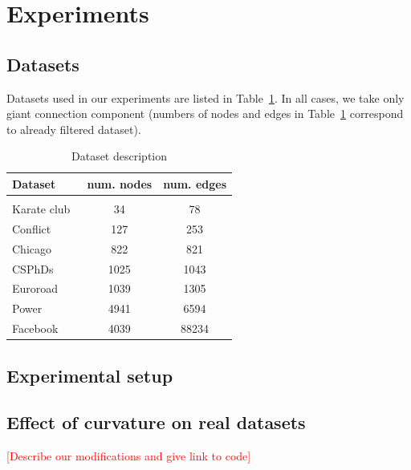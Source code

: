 \documentclass{article} %
\begin{document}
\section{Experiments}

\subsection{Datasets}\label{sec:datasets}

Datasets used in our experiments are listed in Table~\ref{tab:datasets}. In all cases, we take only giant connection component (numbers of nodes and edges in Table~\ref{tab:datasets} correspond to already filtered dataset).

\begin{table}[t]
\caption{Dataset description}
\label{tab:datasets}
\begin{center}
\begin{tabular}{lcc}
Dataset & num. nodes & num. edges \\
 \hline \\
Karate club~\citep{zachary1977information} 
    	& 34 & 78   \\
Conflict~\citep{ward2007disputes} & 127 & 253 \\
Chicago~\citep{eash1979equilibrium} & 822 & 821 \\
CSPhDs~\citep{nooy2006exploratory} & 1025 & 1043 \\
Euroroad~\citep{vsubelj2011robust} &  1039 & 1305 \\
Power~\citep{watts1998collective} & 4941 & 6594 \\
Facebook~\cite{leskovec2012learning} & 4039 & 88234 \\
\end{tabular}
\end{center}
\end{table}

\subsection{Experimental setup}\label{sec:setup}

\subsection{Effect of curvature on real datasets}\label{sec:figures}

\textcolor{red}{[Describe our modifications and give link to code]}
\end{document}
